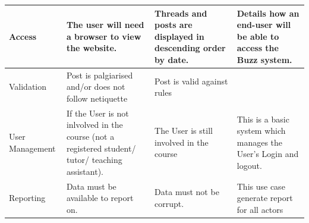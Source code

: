 \documentclass[a4paper,12pt]{report}
\begin{document}
\begin{center}
\begin{tabular}{| p{3cm} | p{4cm} | p{4cm} | p{4cm} |}
    Access & The user will need a browser to view the website. & Threads and posts are displayed in descending order by date. & Details how an end-user will be able to access the Buzz system. \\ \hline
    Validation & Post is palgiarised and/or does not follow netiquette & Post is valid against rules  & \\ \hline
    User Management & If the User is not inlvolved in the course (not a registered student/ tutor/ teaching assistant).  & The User is still involved in the course & This is a basic system which manages the User's Login and logout. \\ \hline
    Reporting & Data must be available to report on. & Data must not be corrupt. & This use case generate report for all actors\\ \hline
    \hline
  \end{tabular}
\end{center}
\end{document}
